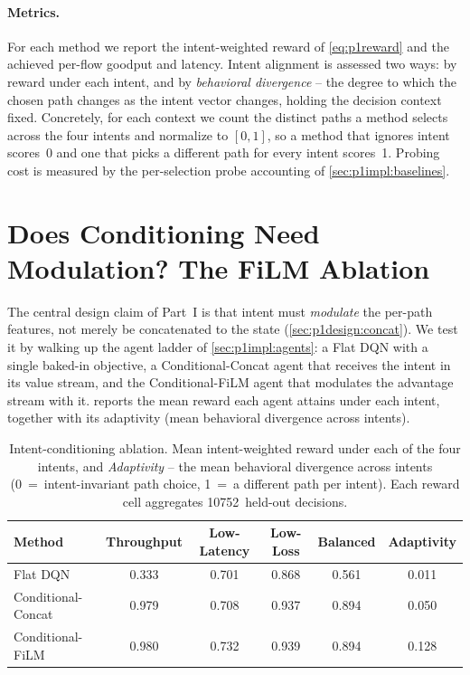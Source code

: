 \paragraph{Metrics.} For each method we report the intent-weighted reward of \cref{eq:p1reward} and the
achieved per-flow goodput and latency. Intent alignment is assessed two ways: by reward under each
intent, and by \emph{behavioral divergence} -- the degree to which the chosen path changes as the intent
vector changes, holding the decision context fixed. Concretely, for each context we count the distinct
paths a method selects across the four intents and normalize to $[0,1]$, so a method that ignores intent
scores~0 and one that picks a different path for every intent scores~1. Probing cost is measured by the
per-selection probe accounting of \cref{sec:p1impl:baselines}.

\section{Does Conditioning Need Modulation? The FiLM Ablation}
\label{sec:p1eval:ablation}

The central design claim of Part~I is that intent must \emph{modulate} the per-path features, not merely
be concatenated to the state (\cref{sec:p1design:concat}). We test it by walking up the agent ladder of
\cref{sec:p1impl:agents}: a Flat DQN with a single baked-in objective, a Conditional-Concat agent that
receives the intent in its value stream, and the Conditional-FiLM agent that modulates the advantage
stream with it.  reports the mean reward each agent attains under each intent,
together with its adaptivity (mean behavioral divergence across intents).

\begin{table}[t]
  \centering
  \caption{Intent-conditioning ablation. Mean intent-weighted reward under each of the four intents, and
  \emph{Adaptivity} -- the mean behavioral divergence across intents (0~=~intent-invariant path choice,
  1~=~a different path per intent). Each reward cell aggregates 10752~held-out decisions.}
  \label{tab:p1eval:ablation}
  \begin{tabular}{lccccc}
    \toprule
    Method & Throughput & Low-Latency & Low-Loss & Balanced & Adaptivity \\
    \midrule
    Flat DQN            & 0.333 & 0.701 & 0.868 & 0.561 & 0.011 \\
    Conditional-Concat  & 0.979 & 0.708 & 0.937 & 0.894 & 0.050 \\
    Conditional-FiLM    & 0.980 & 0.732 & 0.939 & 0.894 & 0.128 \\
    \bottomrule
  \end{tabular}
\end{table}


